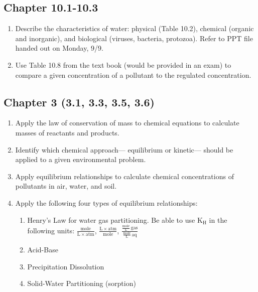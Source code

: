 \documentclass[12pt,letterpaper]{article}
\begin{document}
\subsection *{Chapter 10.1-10.3}
\begin{enumerate}
\item Describe the characteristics of water: physical (Table 10.2), chemical (organic and inorganic), and biological (viruses, bacteria, protozoa). Refer to PPT file handed out on Monday, 9/9.
\item Use Table 10.8 from the text book (would be provided in an exam) to compare a given concentration of a pollutant to the regulated concentration.
\end{enumerate}

\subsection *{Chapter 3 (3.1, 3.3, 3.5, 3.6)}

\begin{enumerate}
\item Apply the law of conservation of mass to chemical equations to calculate masses of reactants and products.
\item Identify which chemical approach--- equilibrium or kinetic--- should be applied to a given environmental problem.
\item Apply equilibrium relationships to calculate chemical concentrations of pollutants in air, water, and soil.
\item Apply the following four types of equilibrium relationships: 
\begin{enumerate}
\item Henry's Law for water gas partitioning.  Be able to use K$\mathrm{_H}$ in the following units: $\mathrm{\frac{mole}{L\times atm}}$, $\mathrm{\frac{L\times atm}{mole}}$, $\mathrm{\frac{\frac{mole}{L}\, gas}{\frac{mole}{L}\, aq}}$
\item Acid-Base
\item Precipitation Dissolution
\item Solid-Water Partitioning (sorption)
\end{enumerate}

\end{enumerate}
\end{document}
